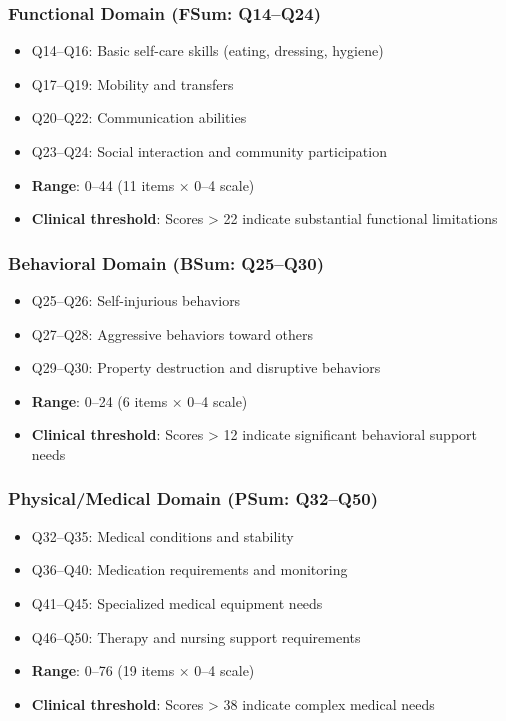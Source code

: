 \subsubsection{Functional Domain (FSum: Q14--Q24)}
\begin{itemize}
    \item Q14--Q16: Basic self-care skills (eating, dressing, hygiene)
    \item Q17--Q19: Mobility and transfers
    \item Q20--Q22: Communication abilities
    \item Q23--Q24: Social interaction and community participation
    \item \textbf{Range}: 0--44 (11 items × 0--4 scale)
    \item \textbf{Clinical threshold}: Scores > 22 indicate substantial functional limitations
\end{itemize}

\subsubsection{Behavioral Domain (BSum: Q25--Q30)}
\begin{itemize}
    \item Q25--Q26: Self-injurious behaviors
    \item Q27--Q28: Aggressive behaviors toward others
    \item Q29--Q30: Property destruction and disruptive behaviors
    \item \textbf{Range}: 0--24 (6 items × 0--4 scale)
    \item \textbf{Clinical threshold}: Scores > 12 indicate significant behavioral support needs
\end{itemize}

\subsubsection{Physical/Medical Domain (PSum: Q32--Q50)}
\begin{itemize}
    \item Q32--Q35: Medical conditions and stability
    \item Q36--Q40: Medication requirements and monitoring
    \item Q41--Q45: Specialized medical equipment needs
    \item Q46--Q50: Therapy and nursing support requirements
    \item \textbf{Range}: 0--76 (19 items × 0--4 scale)
    \item \textbf{Clinical threshold}: Scores > 38 indicate complex medical needs
\end{itemize}

